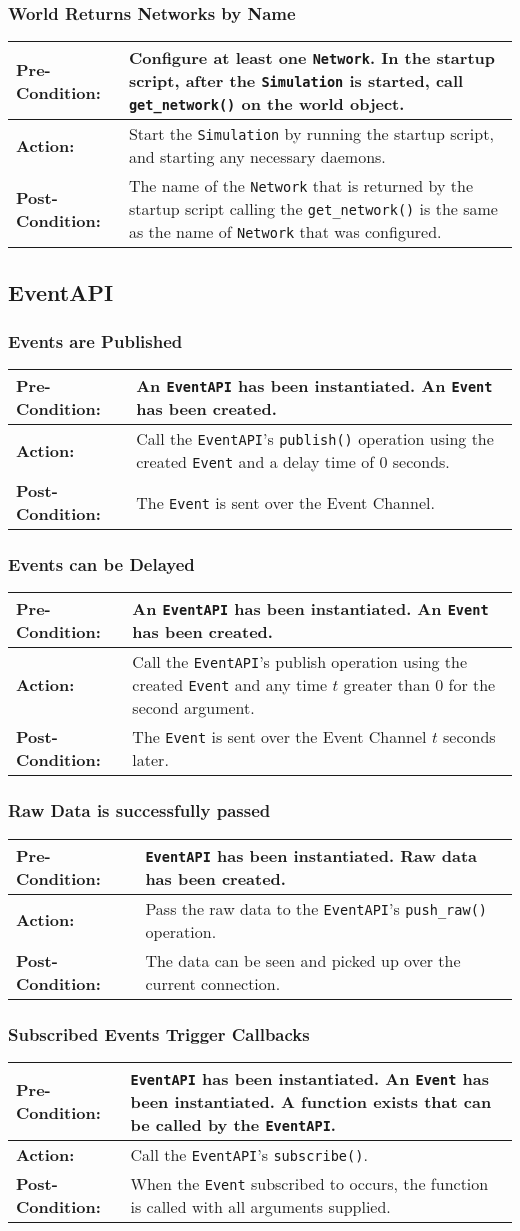 \documentclass[titlepage]{article}
\newcommand{\testcase}[3]{
    \begin{center}
    \begin{tabular}{| l | p{0.7\textwidth}|}
        \hline
        \rowcolor[gray]{0.8}\textbf{Pre-Condition:} & #1 \\ \hline
        \textbf{Action:} & #2 \\ \hline
        \rowcolor[gray]{0.8}\textbf{Post-Condition:} & #3 \\ \hline
    \end{tabular}
    \end{center}
}
\begin{document}
\subsubsection{World Returns Networks by Name}
\testcase{Configure at least one \texttt{Network}.  In the startup script, after the \texttt{Simulation} is started, call \texttt{get\_network()} on the world object.}{Start the \texttt{Simulation} by running the startup script, and starting any necessary daemons.}{The name of the \texttt{Network} that is returned by the startup script calling the \texttt{get\_network()} is the same as the name of \texttt{Network} that was configured.}

\subsection{EventAPI}
\subsubsection{Events are Published}
\testcase{An \texttt{EventAPI} has been instantiated. An \texttt{Event} has been created.}{Call the \texttt{EventAPI}'s \texttt{publish()} operation using the created \texttt{Event} and a delay time of 0 seconds.}{The \texttt{Event} is sent over the Event Channel.}

\subsubsection{Events can be Delayed}
\testcase{An \texttt{EventAPI} has been instantiated. An \texttt{Event} has been created.}{Call the \texttt{EventAPI}'s publish operation using the created \texttt{Event} and any time $t$ greater than 0 for the second argument.}{The \texttt{Event} is sent over the Event Channel $t$ seconds later.}

\subsubsection{Raw Data is successfully passed}
\testcase{\texttt{EventAPI} has been instantiated. Raw data has been created.}{Pass the raw data to the \texttt{EventAPI}'s \texttt{push\_raw()} operation.}{The data can be seen and picked up over the current connection.}

\subsubsection{Subscribed Events Trigger Callbacks}
\testcase{\texttt{EventAPI} has been instantiated.  An \texttt{Event} has been instantiated. A function exists that can be called by the \texttt{EventAPI}.}{Call the \texttt{EventAPI}'s \texttt{subscribe()}.}{When the \texttt{Event} subscribed to occurs, the function is called with all arguments supplied. }
\end{document}
